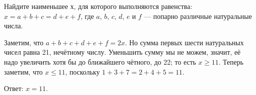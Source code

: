 
\begin{itemize}
\itC Найдите наименьшее $х$, для которого выполняются равенства:
$x = a+b+c = d+e+f$, где $a$, $b$, $c$, $d$, $e$ и $f$ --- попарно различные натуральные числа.

\itr Заметим, что $a+b+c+d+e+f=2x$. Но сумма первых шести натуральных чисел равна 21, нечётному числу.
Уменьшить сумму мы не можем, значит, её надо увеличить хотя бы до ближайшего чётного, до 22;
то есть $x \ge 11$. Теперь заметим, что $x \le 11$, поскольку
$1 + 3 +7 = 2 + 4 + 5 = 11$.

Ответ: $x=11$.
\end{itemize}
